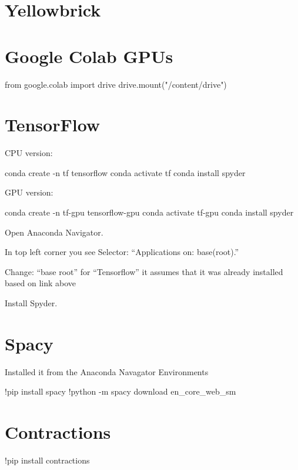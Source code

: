 	\section{Yellowbrick}


	\section{Google Colab GPUs}


from google.colab import drive
drive.mount("/content/drive")


	\section{TensorFlow}
\noindent CPU version:
	\begin{code}[\codenumbering]{}
		\codeitemnonumber conda create -n tf tensorflow
		\codeitemnonumber conda activate tf
		\codeitemnonumber conda install spyder
	\end{code}

\noindent GPU version:
	\begin{code}[\codenumbering]{}
		\codeitemnonumber conda create -n tf-gpu tensorflow-gpu
		\codeitemnonumber conda activate tf-gpu
		\codeitemnonumber conda install spyder
	\end{code}

	\begin{numberedlist}
		\item Open Anaconda Navigator.
		\item In top left corner you see Selector: ``Applications on: base(root).''
		\item Change: ``base root'' for ``Tensorflow'' it assumes that it was already installed based on link above
		\item Install Spyder.
	\end{numberedlist}


	\section{Spacy}
Installed it from the Anaconda Navagator Environments
	\begin{code}[\codenumbering]{}
		\codeitemnonumber !pip install spacy
		\codeitemnonumber !python -m spacy download en\_core\_web\_sm
	\end{code}

	\section{Contractions}
	\begin{code}[\codenumbering]{}
		\codeitemnonumber !pip install contractions
	\end{code}